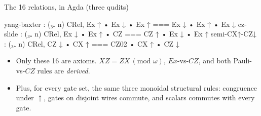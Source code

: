 \documentclass[aspectratio=169]{beamer}
\begin{document}
\begin{frame}{The 16 relations, in Agda (three qudits)}
\begin{code}
    yang-baxter  :        (₃₊ n) CRel,  Ex ↑ • Ex ↓ • Ex ↑ === Ex ↓ • Ex ↑ • Ex ↓
    cz-slide     :        (₃₊ n) CRel,  Ex ↓ • Ex ↑ • CZ === CZ ↑ • Ex ↓ • Ex ↑
    semi-CX↑-CZ↓ :        (₃₊ n) CRel,  CZ ↓ • CX ↑ === CZ02 • CX ↑ • CZ ↓
\end{code}
  \vfill
  \begin{itemize}
    \item Only \alert{these 16} are axioms.  $XZ = ZX\,(\text{mod }
      \omega)$, $\mathit{Ex}$-vs-$CZ$, and both Pauli-vs-$CZ$ rules
      are \emph{derived}.
    \item Plus, for every gate set, the same three monoidal structural
      rules: congruence under $\uparrow$, gates on disjoint wires
      commute, and scalars commutes with every gate.
  \end{itemize}
\end{frame}
\end{document}
